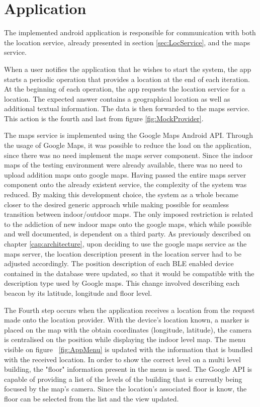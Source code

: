 \section{Application} 
\label{sec:app} 
 
 
The implemented android application is responsible for communication with both the location service, already presented in section \ref{sec:LocService}, and the maps service. 
 
 
When a user notifies the application that he wishes to start the system, the app starts a periodic operation that provides a location at the end of each iteration. At the beginning of each operation, the app requests the location service for a location. The expected answer contains a geographical location as well as additional  textual information. The data is then forwarded to the maps service. This action is the fourth and last from figure \ref{fig:MockProvider}. 
 
 
The maps service is implemented using the Google Maps Android API. Through the usage of Google Maps, it was possible to reduce the load on the application, since there was no need implement the maps server component. Since the indoor maps of the testing environment were already available, there was no need to upload addition maps onto google maps. Having passed the entire maps server component onto the already existent service, the complexity of the system was reduced. By making this development choice, the system as a whole became closer to the desired generic approach while making possible for seamless transition between indoor/outdoor maps. The only imposed restriction is related to the addiction of new indoor maps onto the google maps, which while possible and well documented, is dependent on a third party. As previously described on chapter \ref{cap:architecture}, upon deciding to use the google maps service as the maps server, the location description present in the location server had to be adjusted accordingly. The position description of each \ac{BLE} enabled device contained in the database were updated, so that it would be compatible with the description type used by Google maps. This change involved describing each beacon by its latitude, longitude and floor level. 
 
 
The Fourth step occurs when the application receives a location from the request made onto the location provider. With the device's location known, a marker is placed on the map with the obtain coordinates (longitude, latitude), the camera is centralised on the position while displaying the indoor level map. The menu visible on figure ~\ref{fig:AppMenu} is updated with the information that is bundled with the received location. In order to show the correct level on a multi level building, the "floor" information present in the menu is used. The Google API is capable of providing a list of the levels of the building that is currently being focused by the map's camera. Since the location's associated floor is know, the floor can be selected from the list and the view updated. 
 

